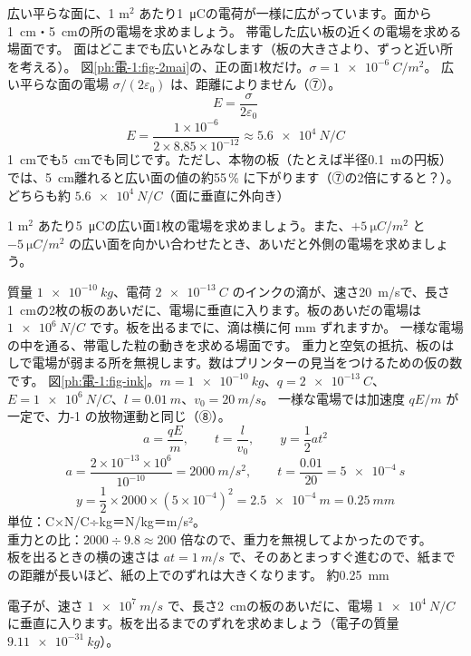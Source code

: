 \label{ph:電-1:ex11}
\begin{phreidai}[広い平らな面の電場]
広い平らな面に、1 m$^2$ あたり\qty{1}{\micro C}の電荷が一様に広がっています。面から\qty{1}{cm}・\qty{5}{cm}の所の電場を求めましょう。
\phbamen
帯電した広い板の近くの電場を求める場面です。
\phmushi
面はどこまでも広いとみなします（板の大きさより、ずっと近い所を考える）。
\phzu
図\ref{ph:電-1:fig-2mai}の、正の面1枚だけ。$\sigma=\qty{1e-6}{C/m^2}$。
\phriyu
広い平らな面の電場 $\sigma/(2\varepsilon_0)$ は、距離によりません（⑦）。
\phtateru
\[E=\frac{\sigma}{2\varepsilon_0}\]
\phtoku
\[E=\frac{1\times10^{-6}}{2\times8.85\times10^{-12}}\approx\qty{5.6e4}{N/C}\]
\phtashikame
\qty{1}{cm}でも\qty{5}{cm}でも同じです。ただし、本物の板（たとえば半径\qty{0.1}{m}の円板）では、\qty{5}{cm}離れると広い面の値の約55\,\% に下がります（⑦の2倍にすると？）。
\kotae どちらも約 $\qty{5.6e4}{N/C}$（面に垂直に外向き）
\end{phreidai}
\begin{jibun}
1 m$^2$ あたり\qty{5}{\micro C}の広い面1枚の電場を求めましょう。また、$+\qty{5}{\micro C/m^2}$ と $-\qty{5}{\micro C/m^2}$ の広い面を向かい合わせたとき、あいだと外側の電場を求めましょう。
\end{jibun}

\label{ph:電-1:ex12}
\begin{phreidai}[インクジェットの滴を曲げる]
質量 $\qty{1e-10}{kg}$、電荷 $\qty{2e-13}{C}$ のインクの滴が、速さ\qty{20}{m/s}で、長さ\qty{1}{cm}の2枚の板のあいだに、電場に垂直に入ります。板のあいだの電場は $\qty{1e6}{N/C}$ です。板を出るまでに、滴は横に何 mm ずれますか。
\phbamen
一様な電場の中を通る、帯電した粒の動きを求める場面です。
\phmushi
重力と空気の抵抗、板のはしで電場が弱まる所を無視します。数はプリンターの見当をつけるための仮の数です。
\phzu
図\ref{ph:電-1:fig-ink}。$m=\qty{1e-10}{kg}$、$q=\qty{2e-13}{C}$、$E=\qty{1e6}{N/C}$、$l=\qty{0.01}{m}$、$v_0=\qty{20}{m/s}$。
\phriyu
一様な電場では加速度 $qE/m$ が一定で、力-1 の放物運動と同じ（⑧）。
\phtateru
\[a=\frac{qE}{m},\qquad t=\frac{l}{v_0},\qquad y=\frac12at^2\]
\phtoku
\[a=\frac{2\times10^{-13}\times10^6}{10^{-10}}=\qty{2000}{m/s^2},\qquad t=\frac{0.01}{20}=\qty{5e-4}{s}\]
\[y=\frac12\times2000\times(5\times10^{-4})^2=\qty{2.5e-4}{m}=\qty{0.25}{mm}\]
\phtashikame
単位：C×N/C÷kg＝N/kg＝m/s²。\\
重力との比：$2000\div9.8\approx200$ 倍なので、重力を無視してよかったのです。\\
板を出るときの横の速さは $at=\qty{1}{m/s}$ で、そのあとまっすぐ進むので、紙までの距離が長いほど、紙の上でのずれは大きくなります。
\kotae 約\qty{0.25}{mm}
\end{phreidai}
\begin{jibun}
電子が、速さ $\qty{1e7}{m/s}$ で、長さ\qty{2}{cm}の板のあいだに、電場 $\qty{1e4}{N/C}$ に垂直に入ります。板を出るまでのずれを求めましょう（電子の質量 $\qty{9.11e-31}{kg}$）。
\end{jibun}

